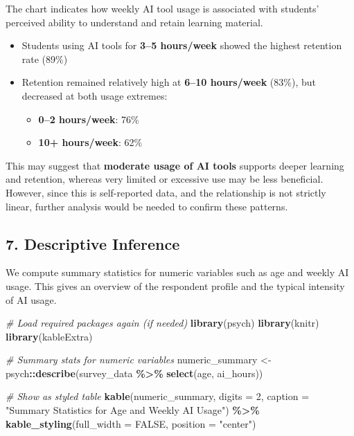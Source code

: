 \documentclass[
]{article}
\newenvironment{Shaded}{\begin{snugshade}}{\end{snugshade}}
\newcommand{\AttributeTok}[1]{\textcolor[rgb]{0.13,0.29,0.53}{#1}}
\newcommand{\CommentTok}[1]{\textcolor[rgb]{0.56,0.35,0.01}{\textit{#1}}}
\newcommand{\ConstantTok}[1]{\textcolor[rgb]{0.56,0.35,0.01}{#1}}
\newcommand{\DecValTok}[1]{\textcolor[rgb]{0.00,0.00,0.81}{#1}}
\newcommand{\FunctionTok}[1]{\textcolor[rgb]{0.13,0.29,0.53}{\textbf{#1}}}
\newcommand{\NormalTok}[1]{#1}
\newcommand{\OtherTok}[1]{\textcolor[rgb]{0.56,0.35,0.01}{#1}}
\newcommand{\SpecialCharTok}[1]{\textcolor[rgb]{0.81,0.36,0.00}{\textbf{#1}}}
\newcommand{\StringTok}[1]{\textcolor[rgb]{0.31,0.60,0.02}{#1}}
\providecommand{\tightlist}{%
  \setlength{\itemsep}{0pt}\setlength{\parskip}{0pt}}
\begin{document}
The chart indicates how weekly AI tool usage is associated with
students' perceived ability to understand and retain learning material.

\begin{itemize}
\tightlist
\item
  Students using AI tools for \textbf{3--5 hours/week} showed the
  highest retention rate (89\%)
\item
  Retention remained relatively high at \textbf{6--10 hours/week}
  (83\%), but decreased at both usage extremes:

  \begin{itemize}
  \tightlist
  \item
    \textbf{0--2 hours/week}: 76\%
  \item
    \textbf{10+ hours/week}: 62\%
  \end{itemize}
\end{itemize}

This may suggest that \textbf{moderate usage of AI tools} supports
deeper learning and retention, whereas very limited or excessive use may
be less beneficial. However, since this is self-reported data, and the
relationship is not strictly linear, further analysis would be needed to
confirm these patterns.

\subsection{7. Descriptive Inference}\label{descriptive-inference}

We compute summary statistics for numeric variables such as age and
weekly AI usage. This gives an overview of the respondent profile and
the typical intensity of AI usage.

\begin{Shaded}
\begin{Highlighting}[]
\CommentTok{\# Load required packages again (if needed)}
\FunctionTok{library}\NormalTok{(psych)}
\FunctionTok{library}\NormalTok{(knitr)}
\FunctionTok{library}\NormalTok{(kableExtra)}

\CommentTok{\# Summary stats for numeric variables}
\NormalTok{numeric\_summary }\OtherTok{\textless{}{-}}\NormalTok{ psych}\SpecialCharTok{::}\FunctionTok{describe}\NormalTok{(survey\_data }\SpecialCharTok{\%\textgreater{}\%} \FunctionTok{select}\NormalTok{(age, ai\_hours))}

\CommentTok{\# Show as styled table}
\FunctionTok{kable}\NormalTok{(numeric\_summary, }\AttributeTok{digits =} \DecValTok{2}\NormalTok{, }\AttributeTok{caption =} \StringTok{"Summary Statistics for Age and Weekly AI Usage"}\NormalTok{) }\SpecialCharTok{\%\textgreater{}\%}
  \FunctionTok{kable\_styling}\NormalTok{(}\AttributeTok{full\_width =} \ConstantTok{FALSE}\NormalTok{, }\AttributeTok{position =} \StringTok{"center"}\NormalTok{)}
\end{Highlighting}
\end{Shaded}
\end{document}
